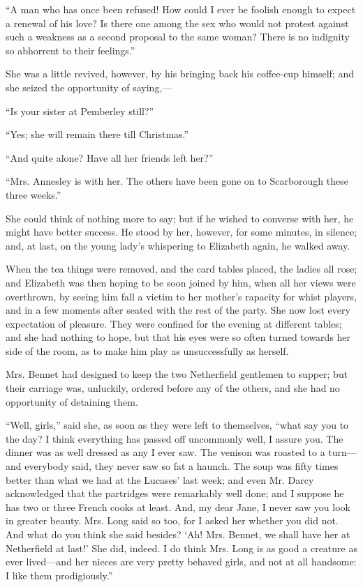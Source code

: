 \documentclass[12pt]{book}
\begin{document}
``A man who has once been refused! How could I ever be foolish enough to expect a renewal of his love? Is there one among the sex who would not protest against such a weakness as a second proposal to the same woman? There is no indignity so abhorrent to their feelings.''

She was a little revived, however, by his bringing back his coffee-cup himself; and she seized the opportunity of saying,---

``Is your sister at Pemberley still?''

``Yes; she will remain there till Christmas.''

``And quite alone? Have all her friends left her?''

``Mrs. Annesley is with her. The others have been gone on to Scarborough these three weeks.''

She could think of nothing more to say; but if he wished to converse with her, he might have better success. He stood by her, however, for some minutes, in silence; and, at last, on the young lady's whispering to Elizabeth again, he walked away.

When the tea things were removed, and the card tables placed, the ladies all rose; and Elizabeth was then hoping to be soon joined by him, when all her views were overthrown, by seeing him fall a victim to her mother's rapacity for whist players, and in a few moments after seated with the rest of the party. She now lost every expectation of pleasure. They were confined for the evening at different tables; and she had nothing to hope, but that his eyes were so often turned towards her side of the room, as to make him play as unsuccessfully as herself.

Mrs. Bennet had designed to keep the two Netherfield gentlemen to supper; but their carriage was, unluckily, ordered before any of the others, and she had no opportunity of detaining them.

``Well, girls,'' said she, as soon as they were left to themselves, ``what say you to the day? I think everything has passed off uncommonly well, I assure you. The dinner was as well dressed as any I ever saw. The venison was roasted to a turn---and everybody said, they never saw so fat a haunch. The soup was fifty times better than what we had at the Lucases' last week; and even Mr. Darcy acknowledged that the partridges were remarkably well done; and I suppose he has two or three French cooks at least. And, my dear Jane, I never saw you look in greater beauty. Mrs. Long said so too, for I asked her whether you did not. And what do you think she said besides? `Ah! Mrs. Bennet, we shall have her at Netherfield at last!' She did, indeed. I do think Mrs. Long is as good a creature as ever lived---and her nieces are very pretty behaved girls, and not at all handsome: I like them prodigiously.''
\end{document}
